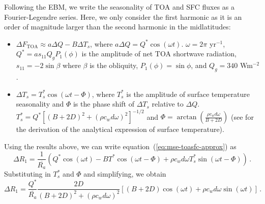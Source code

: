 \documentclass{ametsocV5}
\begin{document}
\appendix[C]
Following the \cite{rose2017} EBM, we write the seasonality of TOA and SFC fluxes as a Fourier-Legendre series. Here, we only consider the first harmonic as it is an order of magnitude larger than the second harmonic in the midlatitudes:
    \begin{itemize}
      \item $\Delta F_{\mathrm{TOA}} \approx a\Delta Q - B\Delta T_{s}$, where $a\Delta Q = Q^{*}\cos(\omega t)$. $\omega=2\pi$ yr$^{-1}$, $Q^{*}=as_{11}Q_{g}P_{1}(\phi)$ is the amplitude of net TOA shortwave radiation, $s_{11}=-2\sin{\beta}$ where $\beta$ is the obliquity, $P_1(\phi) = \sin\phi$, and $Q_{g}=340$ Wm$^{-2}$. 
      \item $\Delta T_{s} = T_{s}^{*}\cos(\omega t - \Phi)$, where $T_{s}^{*}$ is the amplitude of surface temperature seasonality and $\Phi$ is the phase shift of $\Delta T_{s}$ relative to $\Delta Q$. $T_{s}^{*}=Q^{*}\left[(B+2D)^{2}+(\rho c_w d \omega)^{2}\right]^{-1/2}$ and $\Phi=\arctan\left(\frac{\rho c_w d \omega}{B+2D}\right)$ (see \cite{rose2017} for the derivation of the analytical expression of surface temperature).
    \end{itemize}
  Using the results above, we can write equation~(\ref{eq:mse-toasfc-approx}) as
  \begin{equation} \label{eq:r1-linear3}
    \Delta R_{1} = \frac{1}{\overline{R_{a}}}\left(Q^{*}\cos(\omega t) -BT^{*}\cos(\omega t - \Phi)+\rho c_{w} d \omega T_{s}^{*}\sin(\omega t - \Phi) \right) \, .
  \end{equation}
  Substituting in $T_{s}^{*}$ and $\Phi$ and simplifying, we obtain
  \begin{equation} \label{eq:r1-linear4-deriv}
    \Delta R_{1} = \frac{Q^{*}}{\overline{R_{a}}}\frac{2D}{(B+2D)^{2}+(\rho c_w d \omega)^{2}}\left[(B+2D)\cos(\omega t)+\rho c_w d \omega \sin(\omega t)\right] \, .
  \end{equation}



\end{document}
